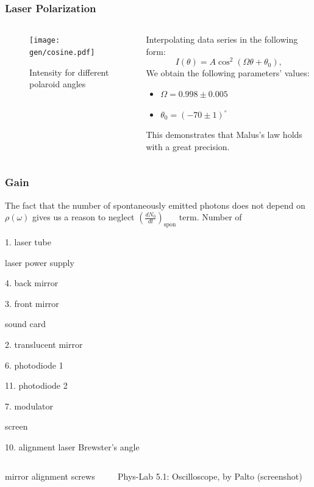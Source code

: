 \documentclass{beamer}
\begin{document}
\begin{frame}
	\frametitle{Laser Polarization}
	
	\begin{columns}
		\begin{column}{0.6\textwidth}
			\begin{figure}
				\centering
				\texttt{[image: gen/cosine.pdf]}
				\caption{Intensity for different polaroid angles}
			\end{figure}
		\end{column}
		\begin{column}{0.4\textwidth}
			Interpolating data series in the following form:
			$$I(\theta) = A \cos^2{(\Omega \theta + \theta_0)},$$
			We obtain the following parameters' values: 
			
			\begin{itemize}
				\item[] $\Omega = 0.998 \pm 0.005$
				\item[] $\theta_0 = (-70 \pm 1)^\circ$
			\end{itemize}
		
		This demonstrates that Malus's law holds with a great precision.
		\end{column}
	\end{columns}
	
	
\end{frame}



\begin{frame}
	\frametitle{Gain}
	The fact that the number of spontaneously emitted photons does not depend on  $\rho(\omega)$ gives us a reason to neglect $\left(\frac{dN_0}{dt}\right)_{\text{spon}}$ term. Number of 
	
	1. laser tube
	
	laser power supply
	
	4. back mirror
	
	3. front mirror
	
	sound card
	
	2. translucent mirror
	
	6. photodiode 1
	
	11. photodiode 2
	
	7. modulator
	
	screen
	
	10. alignment laser
	Brewster's angle


\end{frame}
\begin{frame}
	\begin{columns}
		\begin{column}{0.2\textwidth}
			mirror alignment screws
			
			
		\end{column}
		\begin{column}{0.4\textwidth}
		Phys-Lab 5.1: Oscilloscope, by Palto (screenshot)
		\end{column}
	\end{columns}
\end{frame}
	
\end{document}
